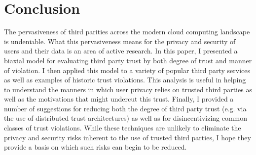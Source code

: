 \section{Conclusion}
\label{sec:conclusion}

The pervasiveness of third parities across the modern cloud computing
landscape is undeniable. What this pervasiveness means for the privacy
and security of users and their data is an area of active research. In
this paper, I presented a biaxial model for evaluating third party
trust by both degree of trust and manner of violation. I then applied
this model to a variety of popular third party services as well as
examples of historic trust violations. This analysis is useful in
helping to understand the manners in which user privacy relies on
trusted third parties as well as the motivations that might undercut
this trust. Finally, I provided a number of suggestions for reducing
both the degree of third party trust (e.g. via the use of distributed
trust architectures) as well as for disincentivizing common classes of
trust violations. While these techniques are unlikely to eliminate the
privacy and security risks inherent to the use of trusted third
parties, I hope they provide a basis on which such risks can begin to
be reduced.
